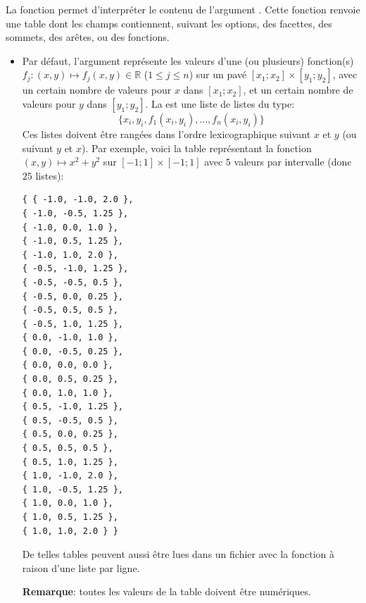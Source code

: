 La fonction  permet d'interpréter le contenu de l'argument . Cette fonction renvoie une table dont les champs contiennent, suivant les options, des facettes, des sommets, des arêtes, ou des fonctions.
\begin{itemize}
    \item Par défaut, l'argument  représente les valeurs d'une (ou plusieurs) fonction(s) $f_j\colon (x,y) \mapsto f_j(x,y)\in\mathbb R$ ($1\leqslant j \leqslant n$) sur un pavé $[x_1;x_2]\times [y_1;y_2]$, avec un certain nombre de valeurs pour $x$ dans $[x_1;x_2]$, et un certain nombre de valeurs pour $y$ dans $[y_1;y_2]$. La  est une liste de listes du type:\[\{x_i,y_i,f_1(x_i,y_i),\ldots,f_n(x_i,y_i)\}\]
Ces listes doivent être rangées dans l'ordre lexicographique suivant $x$ et $y$ (ou suivant $y$ et $x$). Par exemple, voici la table représentant la fonction $(x,y)\mapsto x^2+y^2$ sur $[-1;1]\times[-1;1]$ avec $5$ valeurs par intervalle (donc $25$ listes):
\begin{verbatim}
{ { -1.0, -1.0, 2.0 },
{ -1.0, -0.5, 1.25 },
{ -1.0, 0.0, 1.0 },
{ -1.0, 0.5, 1.25 },
{ -1.0, 1.0, 2.0 },
{ -0.5, -1.0, 1.25 },
{ -0.5, -0.5, 0.5 },
{ -0.5, 0.0, 0.25 },
{ -0.5, 0.5, 0.5 },
{ -0.5, 1.0, 1.25 },
{ 0.0, -1.0, 1.0 },
{ 0.0, -0.5, 0.25 },
{ 0.0, 0.0, 0.0 },
{ 0.0, 0.5, 0.25 },
{ 0.0, 1.0, 1.0 },
{ 0.5, -1.0, 1.25 },
{ 0.5, -0.5, 0.5 },
{ 0.5, 0.0, 0.25 },
{ 0.5, 0.5, 0.5 },
{ 0.5, 1.0, 1.25 },
{ 1.0, -1.0, 2.0 },
{ 1.0, -0.5, 1.25 },
{ 1.0, 0.0, 1.0 },
{ 1.0, 0.5, 1.25 },
{ 1.0, 1.0, 2.0 } }
\end{verbatim}
De telles tables peuvent aussi être lues dans un fichier avec la fonction  à raison d'une liste par ligne.

\textbf{Remarque}: toutes les valeurs de la table doivent être numériques.


\end{itemize}
